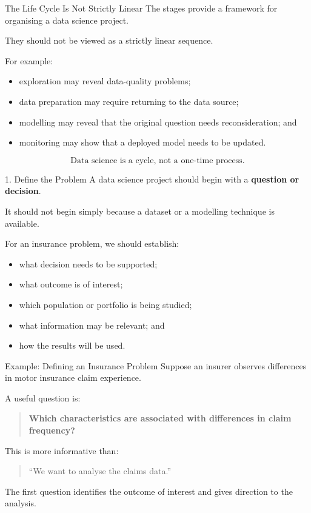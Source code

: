 \documentclass[
  ignorenonframetext,
  aspectratio=169,
]{beamer}
\providecommand{\tightlist}{%
  \setlength{\itemsep}{0pt}\setlength{\parskip}{0pt}}
\begin{document}
\begin{frame}{The Life Cycle Is Not Strictly Linear}
\protect{}\label{the-life-cycle-is-not-strictly-linear}
The stages provide a framework for organising a data science project.

They should not be viewed as a strictly linear sequence.

For example:

\begin{itemize}
\tightlist
\item
  exploration may reveal data-quality problems;
\item
  data preparation may require returning to the data source;
\item
  modelling may reveal that the original question needs reconsideration;
  and
\item
  monitoring may show that a deployed model needs to be updated.
\end{itemize}

\[
\boxed{\text{Data science is a cycle, not a one-time process.}}
\]
\end{frame}

\begin{frame}{1. Define the Problem}
\protect{}\label{define-the-problem}
A data science project should begin with a \textbf{question or
decision}.

It should not begin simply because a dataset or a modelling technique is
available.

For an insurance problem, we should establish:

\begin{itemize}
\tightlist
\item
  what decision needs to be supported;
\item
  what outcome is of interest;
\item
  which population or portfolio is being studied;
\item
  what information may be relevant; and
\item
  how the results will be used.
\end{itemize}
\end{frame}

\begin{frame}{Example: Defining an Insurance Problem}
\protect{}\label{example-defining-an-insurance-problem}
Suppose an insurer observes differences in motor insurance claim
experience.

A useful question is:

\begin{quote}
\textbf{Which characteristics are associated with differences in claim
frequency?}
\end{quote}

This is more informative than:

\begin{quote}
``We want to analyse the claims data.''
\end{quote}

The first question identifies the outcome of interest and gives
direction to the analysis.
\end{frame}
\end{document}
